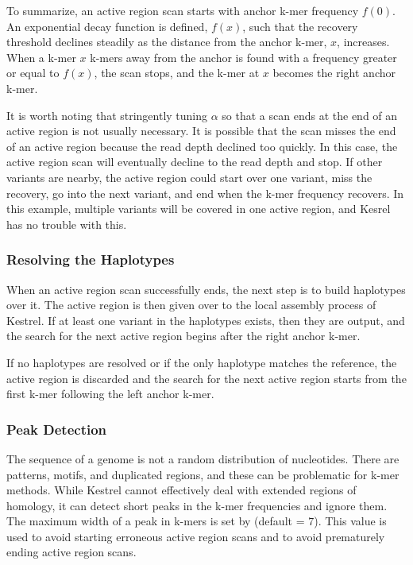 To summarize, an active region scan starts with anchor k-mer frequency $f(0)$. An exponential decay function is defined, $f(x)$, such that the recovery threshold declines steadily as the distance from the anchor k-mer, $x$, increases. When a k-mer $x$ k-mers away from the anchor is found with a frequency greater or equal to $f(x)$, the scan stops, and the k-mer at $x$ becomes the right anchor k-mer.

It is worth noting that stringently tuning $\alpha$ so that a scan ends at the end of an active region is not usually necessary. It is possible that the scan misses the end of an active region because the read depth declined too quickly. In this case, the active region scan will eventually decline to the read depth and stop. If other variants are nearby, the active region could start over one variant, miss the recovery, go into the next variant, and end when the k-mer frequency recovers. In this example, multiple variants will be covered in one active region, and Kesrel has no trouble with this.

\subsubsection{Resolving the Haplotypes}
\label{sec.process.ardetect.resolve}

When an active region scan successfully ends, the next step is to build haplotypes over it. The active region is then given over to the local assembly process of Kestrel. If at least one variant in the haplotypes exists, then they are output, and the search for the next active region begins after the right anchor k-mer.

If no haplotypes are resolved or if the only haplotype matches the reference, the active region is discarded and the search for the next active region starts from the first k-mer following the left anchor k-mer.

\subsubsection{Peak Detection}
\label{sec.process.ardetect.peak}

The sequence of a genome is not a random distribution of nucleotides. There are patterns, motifs, and duplicated regions, and these can be problematic for k-mer methods. While Kestrel cannot effectively deal with extended regions of homology, it can detect short peaks in the k-mer frequencies and ignore them. The maximum width of a peak in k-mers is set by  (default = $7$). This value is used to avoid starting erroneous active region scans and to avoid prematurely ending active region scans.

